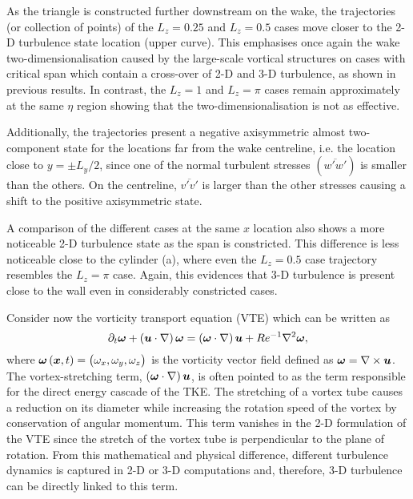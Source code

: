 \documentclass[../main.tex]{subfiles}
\begin{document}
As the triangle is constructed further downstream on the wake, the trajectories (or collection of points) of the $L_z=0.25$ and $L_z=0.5$ cases move closer to the 2-D turbulence state location (upper curve).
This emphasises once again the wake two-dimensionalisation caused by the large-scale vortical structures on cases with critical span which contain a cross-over of 2-D and 3-D turbulence, as shown in previous results.
In contrast, the $L_z=1$ and $L_z=\pi$ cases remain approximately at the same $\eta$ region showing that the two-dimensionalisation is not as effective.

Additionally, the trajectories present a negative axisymmetric almost two-component state for the locations far from the wake centreline, i.e. the location close to $y=\pm L_y/2$, since one of the normal turbulent stresses $(\overline{w'w'})$ is smaller than the others.
On the centreline, $\overline{v'v'}$ is larger than the other stresses causing a shift to the positive axisymmetric state.

A comparison of the different cases at the same $x$ location also shows a more noticeable 2-D turbulence state as the span is constricted.
This difference is less noticeable close to the cylinder (a), where even the $L_z=0.5$ case trajectory resembles the $L_z =\pi$ case.
Again, this evidences that 3-D turbulence is present close to the wall even in considerably constricted cases.

Consider now the vorticity transport equation (VTE) which can be written as
\begin{equation}
\partial_{t}\boldsymbol\omega+\left(\boldsymbol{u}\cdot\nabla \right) \boldsymbol\omega=\left(\boldsymbol\omega\cdot\nabla \right)\boldsymbol{u}+Re^{-1}\nabla^2\boldsymbol\omega,
\end{equation}
where $\boldsymbol\omega\left(\boldsymbol{x}, t\right) = \left(\omega_x, \omega_y, \omega_z\right)$ is the vorticity vector field defined as $\boldsymbol\omega=\nabla\times\boldsymbol{u}$.
The vortex-stretching term, $\left(\boldsymbol\omega\cdot\nabla \right)\boldsymbol{u}$, is often pointed to as the term responsible for the direct energy cascade of the TKE.
The stretching of a vortex tube causes a reduction on its diameter while increasing the rotation speed of the vortex by conservation of angular momentum.
This term vanishes in the 2-D formulation of the VTE since the stretch of the vortex tube is perpendicular to the plane of rotation.
From this mathematical and physical difference, different turbulence dynamics is captured in 2-D or 3-D computations and, therefore, 3-D turbulence can be directly linked to this term.
\end{document}
